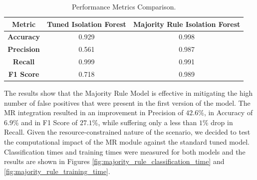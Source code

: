 \documentclass[futureinternet,article,submit,pdftex,moreauthors]{Definitions/mdpi}
\begin{document}
\begin{table}[H]
    \caption{Performance Metrics Comparison.}\label{tab:majority_rule_performanceMetrics}
    \begin{tabularx}{\textwidth}{CCC}
    \toprule
    \textbf{Metric} & \textbf{Tuned Isolation Forest} & \textbf{Majority Rule Isolation Forest} \\
    \midrule
    \textbf{Accuracy}  & 0.929 & 0.998 \\
    \textbf{Precision} & 0.561 & 0.987 \\
    \textbf{Recall}    & 0.999 & 0.991 \\
    \textbf{F1 Score}  & 0.718 & 0.989 \\
    \bottomrule
    \end{tabularx}
\end{table}

The results show that the Majority Rule Model is effective in mitigating the high number of false positives that were present in the first version of the model. 
The MR integration resulted in an improvement in Precision of $42.6\%$, in Accuracy of $6.9\%$ and in F1 Score of $27.1\%$, while suffering only a less than $1\%$ drop in Recall.
Given the resource-constrained nature of the scenario, we decided to test the computational impact of the MR module against the standard tuned model. 
Classification times and training times were measured for both models and the results are shown in Figures \ref{fig:majority_rule_classification_time} and \ref{fig:majority_rule_training_time}.
\end{document}
